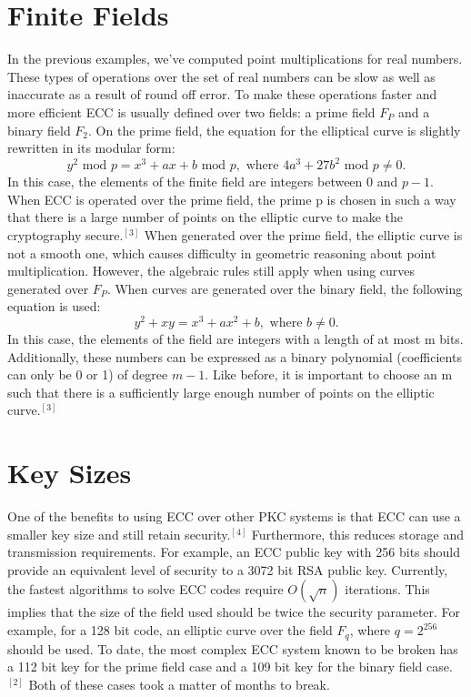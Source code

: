 \documentclass[conference]{IEEEtran}
\begin{document}
\section{Finite Fields}
In the previous examples, we’ve computed point multiplications for real numbers.  These types of operations over the set of real numbers can be slow as well as inaccurate as a result of round off error.  To make these operations faster and more efficient ECC is usually defined over two fields: a prime field $F_P$ and a binary field $F_2$.  On the prime field, the equation for the elliptical curve is slightly rewritten in its modular form:
$$y^2 \text{ mod } p = x^3 + ax + b \text{ mod } p, \text{ where } 4a^3 + 27 b^2 \text{ mod } p \neq 0.$$  In this case, the elements of the finite field are integers between 0 and $p-1$.  When ECC is operated over the prime field, the prime p is chosen in such a way that there is a large number of points on the elliptic curve to make the cryptography secure.$^{[3]}$  When generated over the prime field, the elliptic curve is not a smooth one, which causes difficulty in geometric reasoning about point multiplication.  However, the algebraic rules still apply when using curves generated over $F_P$.  
When curves are generated over the binary field, the following equation is used:
$$y^2 + xy = x^3 + ax^2 + b, \text{ where } b \neq 0.$$  In this case, the elements of the field are integers with a length of at most m bits.  Additionally, these numbers can be expressed as a binary polynomial (coefficients can only be 0 or 1) of degree $m-1$.  Like before, it is important to choose an m such that there is a sufficiently large enough number of points on the elliptic curve.$^{[3]}$  


\section{Key Sizes}
One of the benefits to using ECC over other PKC systems is that ECC can use a smaller key size and still retain security.$^{[4]}$  Furthermore, this reduces storage and transmission requirements.  For example, an ECC public key with 256 bits should provide an equivalent level of security to a 3072 bit RSA public key.  
Currently, the fastest algorithms to solve ECC codes require $O(\sqrt{n})$ iterations.  This implies that the size of the field used should be twice the security parameter.  For example, for a 128 bit code, an elliptic curve over the field $F_q$, where $q = 2^{256}$ should be used.  To date, the most complex ECC system known to be broken has a 112 bit key for the prime field case and a 109 bit key for the binary field case.$^{[2]}$  Both of these cases took a matter of months to break.  
\end{document}
